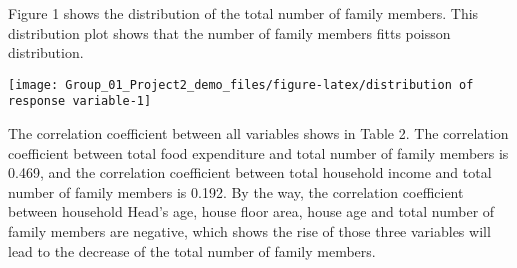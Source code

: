 \documentclass[
]{article}
\begin{document}
\begin{table}

\caption{\label{tab:numerical summaries}Summary statistics of numerical variables}
\centering
{}
\end{table}

Figure 1 shows the distribution of the total number of family members.
This distribution plot shows that the number of family members fitts
poisson distribution.

\begin{center}\texttt{[image: Group\_01\_Project2\_demo\_files/figure-latex/distribution of response variable-1]} \end{center}

The correlation coefficient between all variables shows in Table 2. The
correlation coefficient between total food expenditure and total number
of family members is 0.469, and the correlation coefficient between
total household income and total number of family members is 0.192. By
the way, the correlation coefficient between household Head's age, house
floor area, house age and total number of family members are negative,
which shows the rise of those three variables will lead to the decrease
of the total number of family members.
\end{document}

